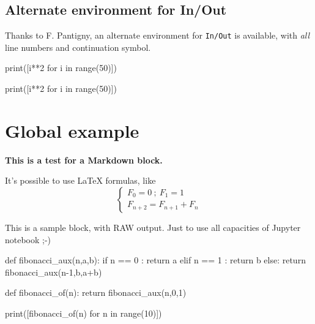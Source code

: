 \documentclass[a4paper,11pt]{article}
\begin{document}

\subsection{Alternate environment for In/Out}

Thanks to F. Pantigny, an alternate environment for \texttt{In/Out} is available, with \textit{all} line numbers and continuation symbol.

\begin{codehigh}
\begin{NotebookPitonAllNum}{0.66\linewidth}
print([i**2 for i in range(50)])
\end{NotebookPitonAllNum}
\end{codehigh}

\begin{NotebookPitonAllNum}{0.66\linewidth}
print([i**2 for i in range(50)])
\end{NotebookPitonAllNum}

\pagebreak


\section{Global example}

\setcounter{JupyterIn}{0}

\begin{NotebookPitonMarkdown}{\linewidth}
{\Large\bfseries This is a test for a \textsf{Markdown} block.}

It's possible to use \LaTeX{} formulas, like %
\[
\left\lbrace\begin{array}{l}
F_0 = 0 \: ; \: F_1 = 1 \\
F_{n+2} = F_{n+1} + F_n
\end{array}\right.
\]
\end{NotebookPitonMarkdown}

\begin{NotebookPitonRaw}{\linewidth}
This is a sample block, with RAW output.
Just to use all capacities of Jupyter notebook ;-)
\end{NotebookPitonRaw}

\begin{NotebookPitonInOut}{\linewidth}
def fibonacci_aux(n,a,b):
	if n == 0 :
		return a
	elif n == 1 :
		return b
	else:
		return fibonacci_aux(n-1,b,a+b)

def fibonacci_of(n):
	return fibonacci_aux(n,0,1)

print([fibonacci_of(n) for n in range(10)])
\end{NotebookPitonInOut}
\end{document}
